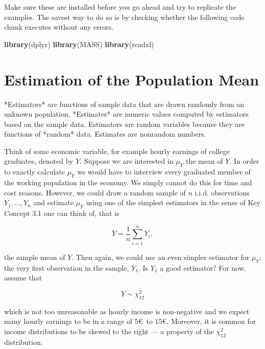\documentclass[]{book}
\newenvironment{Shaded}{\begin{snugshade}}{\end{snugshade}}
\newcommand{\KeywordTok}[1]{\textcolor[rgb]{0.13,0.29,0.53}{\textbf{#1}}}
\newcommand{\NormalTok}[1]{#1}
\theoremstyle{definition}
\theoremstyle{definition}
\theoremstyle{definition}
\theoremstyle{remark}
\begin{document}
Make sure these are installed before you go ahead and try to replicate
the examples. The savest way to do so is by checking whether the
following code chunk executes without any errors.

\begin{Shaded}
\begin{Highlighting}[]
\KeywordTok{library}\NormalTok{(dplyr)}
\KeywordTok{library}\NormalTok{(MASS)}
\KeywordTok{library}\NormalTok{(readxl)}
\end{Highlighting}
\end{Shaded}

\section{Estimation of the Population
Mean}\label{estimation-of-the-population-mean}

\begin{keyconcepts}{3.1}
*Estimators* are functions of sample data that are drawn randomly from an unknown population. *Estimates* are numeric values computed by estimators based on the sample data. Estimators are random variables because they are functions of *random* data. Estimates are nonrandom numbers.
\end{keyconcepts}

Think of some economic variable, for example hourly earnings of college
graduates, denoted by \(Y\). Suppose we are interested in \(\mu_Y\) the
mean of \(Y\). In order to exactly calculate \(\mu_Y\) we would have to
interview every graduated member of the working population in the
economy. We simply cannot do this for time and cost reasons. However, we
could draw a random sample of \(n\) i.i.d. observations
\(Y_1, \dots, Y_n\) and estimate \(\mu_Y\) using one of the simplest
estimators in the sense of Key Concept 3.1 one can think of, that is

\[ \overline{Y} = \frac{1}{n} \sum_{i=1}^n Y_i, \]

the sample mean of \(Y\). Then again, we could use an even simpler
estimator for \(\mu_Y\): the very first observation in the sample,
\(Y_1\). Is \(Y_1\) a good estimator? For now, assume that

\[ Y \sim \chi_{12}^2 \]

which is not too unreasonable as hourly income is non-negative and we
expect many hourly earnings to be in a range of \(5€\,\) to \(15€\).
Moreover, it is common for income distributions to be skewed to the
right --- a property of the \(\chi^2_{12}\) distribution.
\end{document}
